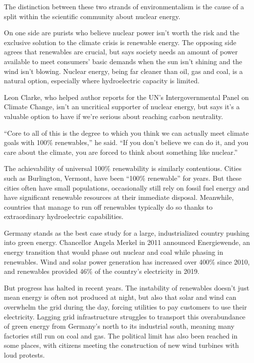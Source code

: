 \documentclass[UTF8,11pt]{ctexart}
\begin{document}
The distinction between these two strands of environmentalism is the cause of a split within the scientific community about nuclear energy.


On one side are purists who believe nuclear power isn’t worth the risk and the exclusive solution to the climate crisis is renewable energy. The opposing side agrees that renewables are crucial, but says society needs an amount of power available to meet consumers’ basic demands when the sun isn’t shining and the wind isn’t blowing. Nuclear energy, being far cleaner than oil, gas and coal, is a natural option, especially where hydroelectric capacity is limited.


Leon Clarke, who helped author reports for the UN’s Intergovernmental Panel on Climate Change, isn’t an uncritical supporter of nuclear energy, but says it’s a valuable option to have if we’re serious about reaching carbon neutrality.


“Core to all of this is the degree to which you think we can actually meet climate goals with 100\% renewables,” he said. “If you don’t believe we can do it, and you care about the climate, you are forced to think about something like nuclear.”


The achievability of universal 100\% renewability is similarly contentious. Cities such as Burlington, Vermont, have been “100\% renewable” for years. But these cities often have small populations, occasionally still rely on fossil fuel energy and have significant renewable resources at their immediate disposal. Meanwhile, countries that manage to run off renewables typically do so thanks to extraordinary hydroelectric capabilities.


Germany stands as the best case study for a large, industrialized country pushing into green energy. Chancellor Angela Merkel in 2011 announced Energiewende, an energy transition that would phase out nuclear and coal while phasing in renewables. Wind and solar power generation has increased over 400\% since 2010, and renewables provided 46\% of the country’s electricity in 2019.


But progress has halted in recent years. The instability of renewables doesn’t just mean energy is often not produced at night, but also that solar and wind can overwhelm the grid during the day, forcing utilities to pay customers to use their electricity. Lagging grid infrastructure struggles to transport this overabundance of green energy from Germany’s north to its industrial south, meaning many factories still run on coal and gas. The political limit has also been reached in some places, with citizens meeting the construction of new wind turbines with loud protests.
\end{document}
